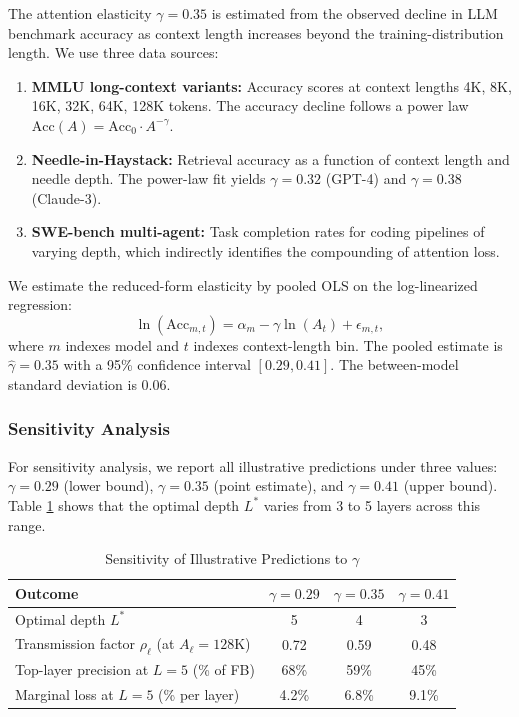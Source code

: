 The attention elasticity $\gamma = 0.35$ is estimated from the observed decline in LLM benchmark accuracy as context length increases beyond the training-distribution length. We use three data sources:

\begin{enumerate}
\item \textbf{MMLU long-context variants:} Accuracy scores at context lengths 4K, 8K, 16K, 32K, 64K, 128K tokens. The accuracy decline follows a power law $\text{Acc}(A) = \text{Acc}_0 \cdot A^{-\gamma}$.
\item \textbf{Needle-in-Haystack:} Retrieval accuracy as a function of context length and needle depth. The power-law fit yields $\gamma = 0.32$ (GPT-4) and $\gamma = 0.38$ (Claude-3).
\item \textbf{SWE-bench multi-agent:} Task completion rates for coding pipelines of varying depth, which indirectly identifies the compounding of attention loss.
\end{enumerate}

We estimate the reduced-form elasticity by pooled OLS on the log-linearized regression:
\begin{equation}\label{eq:gamma_regression}
\ln(\text{Acc}_{m,t}) = \alpha_m - \gamma \ln(A_t) + \epsilon_{m,t},
\end{equation}
where $m$ indexes model and $t$ indexes context-length bin. The pooled estimate is $\hat{\gamma} = 0.35$ with a 95\% confidence interval $[0.29, 0.41]$. The between-model standard deviation is 0.06.

\subsubsection{Sensitivity Analysis}

For sensitivity analysis, we report all illustrative predictions under three values: $\gamma = 0.29$ (lower bound), $\gamma = 0.35$ (point estimate), and $\gamma = 0.41$ (upper bound). Table \ref{tab:sensitivity} shows that the optimal depth $L^*$ varies from 3 to 5 layers across this range.

\begin{table}[htbp]
\centering
\caption{Sensitivity of Illustrative Predictions to $\gamma$}
\label{tab:sensitivity}
\begin{tabular}{@{}lccc@{}}
\toprule
\textbf{Outcome} & $\gamma = 0.29$ & $\gamma = 0.35$ & $\gamma = 0.41$ \\
\midrule
Optimal depth $L^*$ & 5 & 4 & 3 \\
Transmission factor $\rho_\ell$ (at $A_\ell = 128$K) & 0.72 & 0.59 & 0.48 \\
Top-layer precision at $L = 5$ (\% of FB) & 68\% & 59\% & 45\% \\
Marginal loss at $L = 5$ (\% per layer) & 4.2\% & 6.8\% & 9.1\% \\
\bottomrule
\end{tabular}
\end{table}


